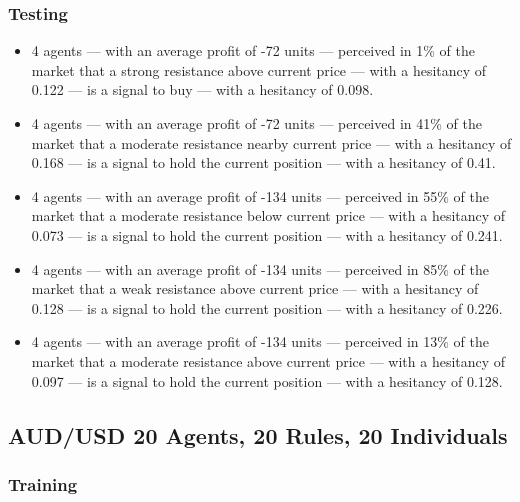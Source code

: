 \subsubsection{Testing}

{\small
  \begin{itemize}
  \item 4 agents — with an average profit of -72 units — perceived in 1\% of the
    market that a strong resistance above current price — with a hesitancy of
    0.122 — is a signal to buy — with a hesitancy of 0.098.
  \item 4 agents — with an average profit of -72 units — perceived in 41\% of
    the market that a moderate resistance nearby current price — with a
    hesitancy of 0.168 — is a signal to hold the current position — with a
    hesitancy of 0.41.
  \item 4 agents — with an average profit of -134 units — perceived in 55\% of
    the market that a moderate resistance below current price — with a hesitancy
    of 0.073 — is a signal to hold the current position — with a hesitancy of
    0.241.
  \item 4 agents — with an average profit of -134 units — perceived in 85\% of
    the market that a weak resistance above current price — with a hesitancy of
    0.128 — is a signal to hold the current position — with a hesitancy of
    0.226.
  \item 4 agents — with an average profit of -134 units — perceived in 13\% of
    the market that a moderate resistance above current price — with a hesitancy
    of 0.097 — is a signal to hold the current position — with a hesitancy of
    0.128.
  \end{itemize}
}

\subsection{AUD/USD 20 Agents, 20 Rules, 20 Individuals}
\label{}


\subsubsection{Training}
\label{}

